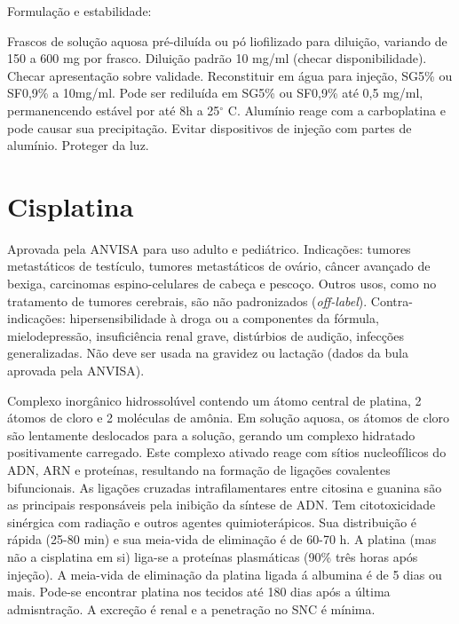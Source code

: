 \documentclass[graybox]{svmult}
\begin{document}
Formulação e estabilidade: 
		
Frascos de solução aquosa pré-diluída ou pó liofilizado para diluição, variando de 150 a 600 mg por frasco. Diluição padrão 10 mg/ml (checar disponibilidade). Checar apresentação sobre validade. Reconstituir em água para injeção, SG5\% ou SF0,9\% a 10mg/ml. Pode ser rediluída em SG5\% ou SF0,9\% até 0,5 mg/ml, permanencendo estável por até 8h a 25\(^\circ\) C. Alumínio reage com a carboplatina e pode causar sua precipitação. Evitar dispositivos de injeção com partes de alumínio. Proteger da luz.

\section{Cisplatina}

Aprovada pela ANVISA para uso adulto e pediátrico. Indicações: tumores metastáticos de testículo, tumores metastáticos de ovário, câncer avançado de bexiga, carcinomas espino-celulares de cabeça e pescoço. Outros usos, como no tratamento de tumores cerebrais, são não padronizados (\textit{off-label}). Contra-indicações: hipersensibilidade à droga ou a componentes da fórmula, mielodepressão, insuficiência renal grave, distúrbios de audição, infecções generalizadas. Não deve ser usada na gravidez ou lactação (dados da bula aprovada pela ANVISA). 

	Complexo inorgânico hidrossolúvel contendo um átomo central de platina, 2 átomos de cloro e 2 moléculas de amônia. Em solução aquosa, os átomos de cloro são lentamente deslocados para a solução, gerando um complexo hidratado positivamente carregado. Este complexo ativado reage com sítios nucleofílicos do ADN, ARN e proteínas, resultando na formação de ligações covalentes bifuncionais. As ligações cruzadas intrafilamentares entre citosina e guanina são as principais responsáveis pela inibição da síntese de ADN. Tem citotoxicidade sinérgica com radiação e outros agentes quimioterápicos. Sua distribuição é rápida (25-80 min) e sua meia-vida de eliminação é de 60-70 h. A platina (mas não a cisplatina em si) liga-se a proteínas plasmáticas (90\% três horas após injeção). A meia-vida de eliminação da platina ligada á albumina é de 5 dias ou mais. Pode-se encontrar platina nos tecidos até 180 dias após a última admisntração. A excreção é renal e a penetração no SNC é mínima.
\end{document}
